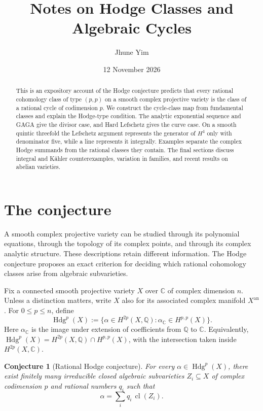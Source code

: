 \documentclass[11pt,reqno]{amsart}
\title[Hodge Classes]
{Notes on Hodge Classes and Algebraic Cycles}
\author{Jhune Yim} %
\date{12 November 2026}
\newtheorem{conjecture}[theorem]{Conjecture}
\theoremstyle{definition}
\theoremstyle{remark}
\numberwithin{equation}{section}
\newcommand{\C}{\mathbb{C}}
\newcommand{\Q}{\mathbb{Q}}
\newcommand{\an}{\mathrm{an}}
\DeclareMathOperator{\Hdg}{Hdg}
\DeclareMathOperator{\cl}{cl}
\begin{document}
\raggedbottom

\begin{abstract}
This is an expository account of the Hodge conjecture predicts that
every rational cohomology class of type $(p,p)$ on a smooth complex
projective variety is the class of a rational cycle of codimension
$p$. We construct the cycle-class map from fundamental classes and
explain the Hodge-type condition. The analytic exponential sequence
and GAGA give the divisor case, and Hard Lefschetz gives the curve
case. On a smooth quintic threefold the Lefschetz argument represents the
generator of $H^4$ only with denominator five, while a line represents it
integrally. Examples separate the complex Hodge summands from the rational
classes they contain. The final sections discuss integral and K\"ahler
counterexamples, variation in families, and recent results on abelian
varieties.
\end{abstract}

\maketitle

\setcounter{tocdepth}{1}
\tableofcontents

\section{The conjecture}\label{sec:question}

A smooth complex projective variety can be studied through its polynomial
equations, through the topology of its complex points, and through its complex
analytic structure. These descriptions retain different information. The Hodge
conjecture proposes an exact criterion for deciding which rational cohomology
classes arise from algebraic subvarieties.

Fix a connected smooth projective variety $X$ over $\C$ of complex dimension $n$.
Unless a distinction matters, write $X$ also for its associated complex manifold
$X^{\an}$. For $0\leq p\leq n$, define
\begin{equation}\label{eq:hodgeclasses}
 \Hdg^p(X):=\{\alpha\in H^{2p}(X,\Q):
                 \alpha_{\C}\in H^{p,p}(X)\}.
\end{equation}
Here $\alpha_{\C}$ is the image under extension of coefficients from $\Q$ to
$\C$. Equivalently, $\Hdg^p(X)=H^{2p}(X,\Q)\cap H^{p,p}(X)$, with the
intersection taken inside $H^{2p}(X,\C)$.

\begin{conjecture}[Rational Hodge conjecture]\label{conj:hodge}
For every $\alpha\in\Hdg^p(X)$, there exist finitely many irreducible closed
algebraic subvarieties $Z_i\subseteq X$ of complex codimension $p$ and rational
numbers $q_i$ such that
\begin{equation}\label{eq:main}
 \alpha=\sum_i q_i\,\cl(Z_i).
\end{equation}
\end{conjecture}
\end{document}
